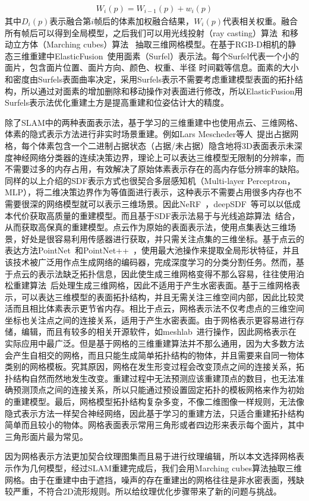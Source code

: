 \begin{align} 
W_{i}(p)=W_{i-1}(p)+w_{i}(p)
\end{align}
其中$D_i(p)$表示融合第$i$帧后的体素加权融合结果，$W_i(p)$代表相关权重。融合所有帧后可以得到全局模型，之后我们可以用光线投射（ray casting）算法~\cite{511}和移动立方体（Marching cubes）算法~\cite{lorensen1987marching} 抽取三维网格模型。在基于RGB-D相机的静态三维重建中ElasticFusion~\cite{ThomasWhelan2015ElasticFusionDS}使用面素（Surfel）表示法。每个Surfel代表一个小的面片，包含面片位置、面片方向、颜色、权重、半径
时间戳等信息。面素的大小和密度由Surfels表面曲率决定，采用Surfels表示不需要考虑重建模型表面的拓扑结构，所以通过对面素的增加删除和移动操作对表面进行修改，所以ElasticFusion用Surfels表示法优化重建土方是提高重建和位姿估计大的精度。\par
除了SLAM中的两种表面表示法，基于学习的三维重建中也使用点云、三维网格、体素的隐式表示方法进行非实时场景重建。例如Lars Mescheder等人~\cite{LarsMescheder2018OccupancyNL}提出占据网格，每个体素包含一个二进制占据状态（占据/未占据）隐含地将3D表面表示未深度神经网络分类器的连续决策边界，理论上可以表达三维模型无限制的分辨率，而不需要过多的内存占用，有效解决了原始体素表示存在的高内存低分辨率的缺陷。同样的以上介绍的SDF表示方式也很契合多层感知机（Multi-layer Perceptron，MLP），将二维决策边界作为等值面进行表示，这种表示不需要占用很多内存也不需要很深的网络模型就可以表示三维场景。因此NeRF~\cite{mildenhall2021nerf}，deepSDF~\cite{park2019deepsdf}等可以以低成本代价获取高质量的重建模型。而且基于SDF表示法易于与光线追踪算法~\cite{hart1996sphere}结合，从而获取高保真的重建模型。点云作为原始的表面表示法，使用点集表达三维场景，好处是很容易利用传感器进行获取，并只需关注点集的三维坐标。基于点云的表达方法PointNet~\cite{qi2017pointnet}和PointNet++~\cite{qi2017pointnet++}，使用最大池操作来提取全局形状特征，并且该技术被广泛用作点生成网络的编码器，完成深度学习的分类分割任务。然而，基于点云的表示法缺乏拓扑信息，因此使生成三维网格变得不那么容易，往往使用泊松重建算法~\cite{kazhdan2006poisson}后处理生成三维网格，因此不适用于产生水密表面。基于三维网格表示，可以表达三维模型的表面拓扑结构，并且无需关注三维空间内部，因此比较灵活而且相比体素表示更节省内存。相比于点云，网格表示法不仅考虑点的三维空间坐标也关注点之间的连接关系，适用于产生水密表面。由于网格表示更容易进行存储，编辑，而且有较多的相关开源软件，如meshlab~\cite{LocalChapterEvents:ItalChap:ItalianChapConf2008:129-136}进行操作，因此网格表示在实际应用中最广泛。但是基于网格的三维重建算法并不那么通用，因为大多数方法会产生自相交的网格，而且只能生成简单拓扑结构的物体，并且需要来自同一物体类别的网格模板。究其原因，网格在发生形变过程会改变顶点之间的连接关系，拓扑结构自然而然地发生改变。重建过程中无法预测应该重建顶点的数目，也无法准确预测顶点之间的连接关系，所以只能通过预设置固定拓扑的模板网格来作为初始的重建模型。最后，网格模型拓扑结构复杂多变，不像二维图像一样规则，无法像隐式表示方法一样契合神经网络，因此基于学习的重建方法，只适合重建拓扑结构简单而且较小的物体。网格表面表示常用三角形或者四边形来表示每个面片，其中三角形面片最为常见。\par
因为网格表示方法更加契合纹理图集而且易于进行纹理编辑，所以本文选择网格表示作为几何模型，经过SLAM重建完成后，我们会用Marching cubes算法抽取三维网格。由于在重建中由于遮挡，噪声的存在重建出的网格往往是非水密表面，残缺较严重，不符合2D流形规则。所以给纹理优化步骤带来了新的问题与挑战。
